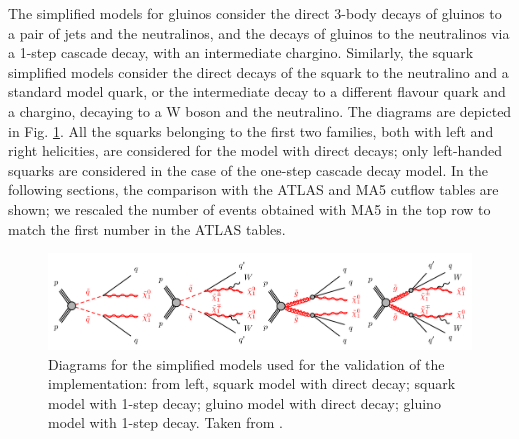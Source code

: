 \documentclass[a4paper,11pt]{article}
\begin{document}
	The simplified models for gluinos consider the direct 3-body decays of gluinos to a pair of jets and the neutralinos, and the decays of gluinos to the neutralinos via a 1-step cascade decay, with an intermediate chargino. Similarly, the squark simplified models consider the direct decays of the squark to the neutralino and a standard model quark, or the intermediate decay to a different flavour quark and a chargino, decaying to a W boson and the neutralino. The diagrams are depicted in Fig. \ref{sms}. All the squarks belonging to the first two families, both with left and right helicities, are considered for the model with direct decays; only left-handed squarks are considered in the case of the one-step cascade decay model.
	In the following sections, the comparison with the ATLAS and MA5 cutflow tables are shown; we rescaled the number of events obtained with MA5 in the top row to match the first number in the ATLAS tables.
	
	\begin{figure}
		\begin{center}
			\includegraphics[width=1\textwidth]{sms.png}	
		\end{center}
		\caption{Diagrams for the simplified models used for the validation of the implementation: from left, squark model with direct decay; squark model with 1-step decay; gluino model with direct decay; gluino model with 1-step decay. Taken from \cite{ATLAS2019vcq}.}
		\label{sms}
	\end{figure}
\end{document}
